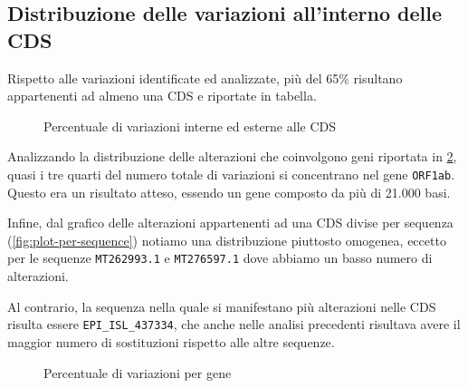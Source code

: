 \documentclass[11pt,italian]{article}
\begin{document}
\subsection{Distribuzione delle variazioni all'interno delle CDS}
Rispetto alle variazioni identificate ed analizzate, più del 65\% risultano appartenenti ad almeno una CDS e riportate in tabella.
\begin{figure}[H]
  \caption{Percentuale di variazioni interne ed esterne alle CDS}
  \label{fig:plot-alterations-in-cds}
\end{figure}

\noindent
Analizzando la distribuzione delle alterazioni che coinvolgono geni riportata in \cref{fig:plot-alterations-per-gene}, quasi i tre quarti del numero totale di variazioni si concentrano nel gene \lstinline{ORF1ab}. Questo era un risultato atteso, essendo un gene composto da più di 21.000 basi.

Infine, dal grafico delle alterazioni appartenenti ad una CDS divise per sequenza (\cref{fig:plot-per-sequence}) notiamo una distribuzione piuttosto omogenea, eccetto per le sequenze \lstinline{MT262993.1} e \lstinline{MT276597.1} dove abbiamo un basso numero di alterazioni.

Al contrario, la sequenza nella quale si manifestano più alterazioni nelle CDS risulta essere \lstinline{EPI_ISL_437334}, che anche nelle analisi precedenti risultava avere il maggior numero di sostituzioni rispetto alle altre sequenze.
\begin{figure}[H]
  \caption{Percentuale di variazioni per gene}
  \label{fig:plot-alterations-per-gene}
\end{figure}
\end{document}
